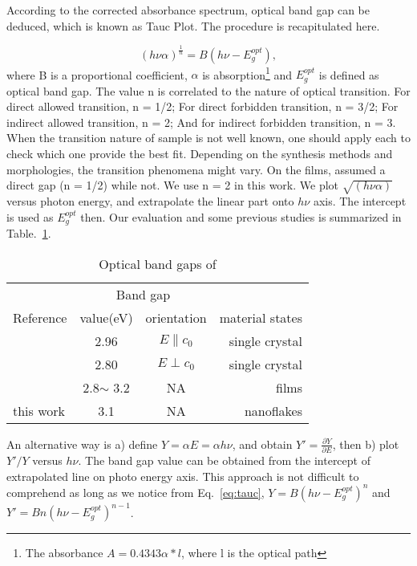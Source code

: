According to the corrected absorbance spectrum, optical band gap can be deduced, which is known as Tauc Plot.\cite{Tauc1972} The procedure is recapitulated here.

\begin{equation}\label{eq:tauc}
 (h\nu \alpha)^{\frac{1}{n}} = B(h\nu - E_g^{opt}),
\end{equation}
where B is a proportional coefficient, $\alpha$ is absorption\footnote{The absorbance $A = 0.4343\alpha*l$, where l is the optical path} and $E_g^{opt}$ is defined as optical band gap. The value n is correlated to the nature of optical transition. For direct allowed transition, n = 1/2; For direct forbidden transition, n = 3/2; For indirect allowed transition, n = 2; And for indirect forbidden transition, n = 3. When the transition nature of sample is not well known, one should apply each to check which one provide the best fit. Depending on the synthesis methods and  morphologies, the transition phenomena might vary. On the  films, \citeauthor{Bouzidi2003} assumed a direct gap (n = 1/2)\cite{Bouzidi2003} while \citeauthor{Szekeres2002} not.\cite{Szekeres2002} We use n = 2 in this work. We plot $\sqrt{(h\nu \alpha)}$ versus photon energy, and extrapolate the linear part onto $h\nu$ axis. The intercept is used as $E_g^{opt}$ then. Our evaluation and some previous studies is summarized in Table.~\ref{tab:mobg}.

\begin{table}[htb]
\centering
\caption{Optical band gaps of }\label{tab:mobg}
\begin{tabular}{lccr}
\toprule
&\multicolumn{2}{c}{Band gap} \\
\cmidrule(l){2-3}
Reference & value(eV) & orientation & material states\\
\midrule
\cite{Deb1968}   & 2.96  & $E\parallel c_0$ & single crystal\\
\cite{Deb1968}   & 2.80  & $E\perp c_0$ & single crystal \\
\cite{Julien1995} & 2.8$\sim$ 3.2 & NA & films\\
 this work  & 3.1  & NA & nanoflakes\\
\bottomrule
\end{tabular}
\end{table}


An alternative way is a) define $Y = \alpha E=\alpha h\nu$, and obtain $Y' = \frac{\partial Y}{\partial E}$, then b) plot $Y'/Y$ versus $h\nu$. The band gap value can be obtained from the intercept of extrapolated line on photo energy axis.\cite{Choopun} This approach is not difficult to comprehend as long as we notice from Eq.~\ref{eq:tauc}, $Y = B (h\nu - E_g^{opt})^n$ and $Y' = B n(h\nu - E_g^{opt})^{n-1}$.

